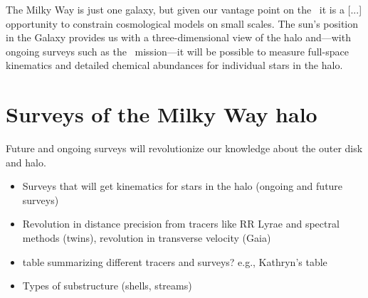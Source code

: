 The Milky Way is just one galaxy, but given our vantage point on the \mwhalo\ it
is a [...] opportunity to constrain cosmological models on small scales. The
sun's position in the Galaxy provides us with a three-dimensional view of the
halo and---with ongoing surveys such as the \gaia\ mission---it will be possible
to measure full-space kinematics and detailed chemical abundances for individual
stars in the halo.

\section{Surveys of the Milky Way halo}\label{sec:mw-surveys}

Future and ongoing surveys will revolutionize our knowledge about the outer disk
and halo.

\begin{itemize}
    \item Surveys that will get kinematics for stars in the halo (ongoing and
    future surveys)
    \item Revolution in distance precision from tracers like RR Lyrae and
    spectral methods (twins), revolution in transverse velocity (Gaia)
    \item table summarizing different tracers and surveys? e.g., Kathryn's table
    \item Types of substructure (shells, streams)
\end{itemize}

